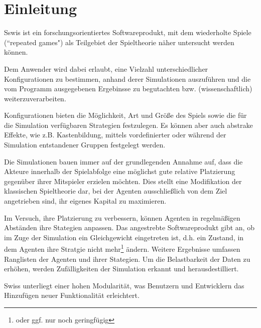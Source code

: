 \section{Einleitung}

Sswis ist ein forschungsorientiertes Softwareprodukt, mit dem wiederholte Spiele (``repeated games") als Teilgebiet der Spieltheorie näher untersucht werden können.

Dem Anwender wird dabei erlaubt, eine Vielzahl unterschiedlicher Konfigurationen zu bestimmen, anhand derer Simulationen auszuführen und die vom Programm ausgegebenen Ergebinsse zu begutachten bzw. (wissenschaftlich) weiterzuverarbeiten.

Konfigurationen bieten die Möglichkeit, Art und Größe des Spiels sowie die für die Simulation verfügbaren Strategien festzulegen. Es können aber auch abstrake Effekte, wie z.B. Kastenbildung, mittels vordefinierter oder während der Simulation entstandener Gruppen festgelegt werden.

Die Simulationen bauen immer auf der grundlegenden Annahme auf, dass die Akteure innerhalb der Spielabfolge eine möglichst gute relative Platzierung gegenüber ihrer Mitspieler erzielen möchten.
Dies stellt eine Modifikation der klassischen Spieltheorie dar, bei der Agenten ausschließlich von dem Ziel angetrieben sind, ihr eigenes Kapital zu maximieren.

Im Versuch, ihre Platzierung zu verbessern, können Agenten in regelmäßigen Abständen ihre Stategien anpassen.
Das angestrebte Softwareprodukt gibt an, ob im Zuge der Simulation ein Gleichgewicht eingetreten ist, d.h. ein Zustand, in dem Agenten ihre Stratgie nicht mehr\footnote{oder ggf. nur noch geringfügig} ändern.
Weitere Ergebnisse umfassen Ranglisten der Agenten und ihrer Stategien.
Um die Belastbarkeit der Daten zu erhöhen, werden Zufälligkeiten der Simulation erkannt und herausdestilliert.

Swiss unterliegt einer hohen Modularität, was Benutzern und Entwicklern das Hinzufügen neuer Funktionalität erleichtert.